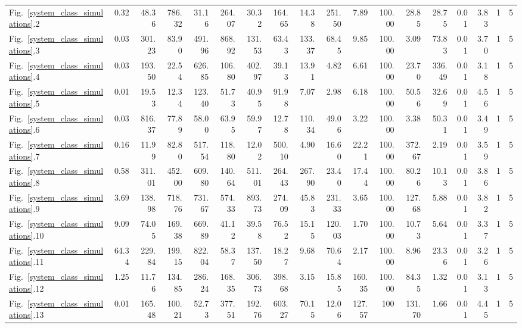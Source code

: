 \begin{table}
\begin{adjustbox}{center}
\begin{tabular}{lrrrrrrrrrrrrrrrrr}
             Fig.~\ref{system_class_simulations}.2 & 0.32 & 48.36 & 786.32 & 31.16 & 264.07 & 30.32 & 164.65 & 14.38 & 251.50 & 7.89 & 100.00 & 28.85 & 28.75 & 0.01 & 3.83 & 1 & 5 \\
             Fig.~\ref{system_class_simulations}.3 & 0.03 & 301.23 & 83.90 & 491.96 & 868.92 & 131.53 & 63.43 & 133.37 & 68.45 & 9.85 & 100.00 & 3.09 & 73.83 & 0.01 & 3.70 & 1 & 5 \\
             Fig.~\ref{system_class_simulations}.4 & 0.03 & 193.50 & 22.54 & 626.85 & 106.80 & 402.97 & 39.13 & 13.91 & 4.82 & 6.61 & 100.00 & 23.70 & 336.49 & 0.01 & 3.18 & 1 & 5 \\
             Fig.~\ref{system_class_simulations}.5 & 0.01 & 19.53 & 12.34 & 123.40 & 51.73 & 40.95 & 91.98 & 7.07 & 2.98 & 6.18 & 100.00 & 50.56 & 32.69 & 0.01 & 4.56 & 1 & 5 \\
             Fig.~\ref{system_class_simulations}.6 & 0.03 & 816.37 & 77.89 & 58.00 & 63.95 & 59.97 & 12.78 & 110.34 & 49.06 & 3.22 & 100.00 & 3.38 & 50.31 & 0.01 & 3.49 & 1 & 5 \\
             Fig.~\ref{system_class_simulations}.7 & 0.16 & 11.99 & 82.80 & 517.54 & 118.80 & 12.02 & 500.10 & 4.90 & 16.60 & 22.21 & 100.00 & 372.67 & 2.19 & 0.01 & 3.59 & 1 & 5 \\
             Fig.~\ref{system_class_simulations}.8 & 0.58 & 311.01 & 452.00 & 609.80 & 140.64 & 511.01 & 264.43 & 267.90 & 23.40 & 17.44 & 100.00 & 80.26 & 10.13 & 0.01 & 3.86 & 1 & 5 \\
             Fig.~\ref{system_class_simulations}.9 & 3.69 & 138.98 & 718.76 & 731.67 & 574.33 & 893.73 & 274.09 & 45.83 & 231.33 & 3.65 & 100.00 & 127.68 & 5.88 & 0.01 & 3.82 & 1 & 5 \\
             Fig.~\ref{system_class_simulations}.10 & 9.09 & 74.05 & 169.38 & 669.89 & 41.12 & 39.58 & 76.52 & 15.15 & 120.03 & 1.70 & 100.00 & 10.73 & 5.64 & 0.01 & 3.37 & 1 & 5 \\
             Fig.~\ref{system_class_simulations}.11 & 64.34 & 229.84 & 199.15 & 822.04 & 58.37 & 137.50 & 18.27 & 9.68 & 70.64 & 2.17 & 100.00 & 8.96 & 23.36 & 0.01 & 3.26 & 1 & 5 \\
             Fig.~\ref{system_class_simulations}.12 & 1.25 & 11.76 & 134.85 & 286.24 & 168.35 & 306.73 & 398.68 & 3.15 & 15.85 & 160.35 & 100.00 & 84.35 & 1.32 & 0.01 & 3.13 & 1 & 5 \\
             Fig.~\ref{system_class_simulations}.13 & 0.01 & 165.48 & 100.21 & 52.73 & 377.51 & 192.76 & 603.27 & 70.15 & 12.06 & 127.57 & 100 & 131.70 & 1.66 & 0.01 & 4.45 & 1 & 5 \\

\end{tabular}
\end{adjustbox}
\end{table}

